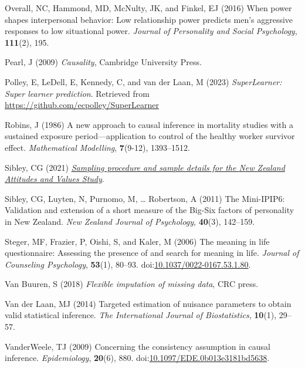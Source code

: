 \documentclass[
  single column]{article}
\newlength{\cslhangindent}
\newenvironment{CSLReferences}[2] %
 {\begin{list}{}{%
  \setlength{\itemindent}{0pt}
  \setlength{\leftmargin}{0pt}
  \setlength{\parsep}{0pt}
  \ifodd #1
   \setlength{\leftmargin}{\cslhangindent}
   \setlength{\itemindent}{-1\cslhangindent}
  \fi
  \setlength{\itemsep}{#2\baselineskip}}}
 {\end{list}}
\begin{document}
\begin{CSLReferences}{1}{0}
Overall, NC, Hammond, MD, McNulty, JK, and Finkel, EJ (2016) When power
shapes interpersonal behavior: Low relationship power predicts men's
aggressive responses to low situational power. \emph{Journal of
Personality and Social Psychology}, \textbf{111}(2), 195.

Pearl, J (2009) \emph{Causality}, Cambridge University Press.

Polley, E, LeDell, E, Kennedy, C, and van der Laan, M (2023)
\emph{SuperLearner: Super learner prediction}. Retrieved from
\url{https://github.com/ecpolley/SuperLearner}

Robins, J (1986) A new approach to causal inference in mortality studies
with a sustained exposure period---application to control of the healthy
worker survivor effect. \emph{Mathematical Modelling}, \textbf{7}(9-12),
1393--1512.

Sibley, CG (2021)
\emph{\href{https://doi.org/10.31234/osf.io/wgqvy}{Sampling procedure
and sample details for the {N}ew {Z}ealand {A}ttitudes and {V}alues
{S}tudy}}.

Sibley, CG, Luyten, N, Purnomo, M, \ldots{} Robertson, A (2011) The
Mini-IPIP6: Validation and extension of a short measure of the Big-Six
factors of personality in {N}ew {Z}ealand. \emph{New Zealand Journal of
Psychology}, \textbf{40}(3), 142--159.

Steger, MF, Frazier, P, Oishi, S, and Kaler, M (2006) The meaning in
life questionnaire: Assessing the presence of and search for meaning in
life. \emph{Journal of Counseling Psychology}, \textbf{53}(1), 80--93.
doi:\href{https://doi.org/10.1037/0022-0167.53.1.80}{10.1037/0022-0167.53.1.80}.

Van Buuren, S (2018) \emph{Flexible imputation of missing data}, CRC
press.

Van der Laan, MJ (2014) Targeted estimation of nuisance parameters to
obtain valid statistical inference. \emph{The International Journal of
Biostatistics}, \textbf{10}(1), 29--57.

VanderWeele, TJ (2009) Concerning the consistency assumption in causal
inference. \emph{Epidemiology}, \textbf{20}(6), 880.
doi:\href{https://doi.org/10.1097/EDE.0b013e3181bd5638}{10.1097/EDE.0b013e3181bd5638}.


\end{CSLReferences}
\end{document}
